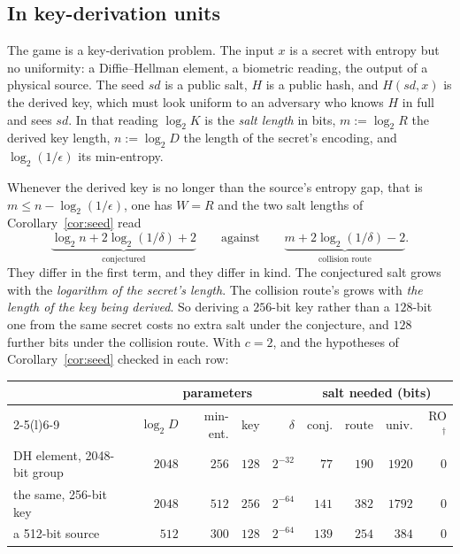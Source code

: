 \documentclass{aicr-solution}
\newcommand{\sd}{\mathit{sd}}
\begin{document}
\subsection*{In key-derivation units}

The game is a key-derivation problem. The input $x$ is a secret with entropy but no uniformity: a
Diffie--Hellman element, a biometric reading, the output of a physical source. The seed $\sd$ is a
public salt, $H$ is a public hash, and $H(\sd,x)$ is the derived key, which must look uniform to an
adversary who knows $H$ in full and sees $\sd$. In that reading $\log_2 K$ is the \emph{salt length}
in bits, $m := \log_2 R$ the derived key length, $n := \log_2 D$ the length of the secret's
encoding, and $\log_2(1/\epsilon)$ its min-entropy.

Whenever the derived key is no longer than the source's entropy gap, that is $m \le n - \log_2(1/\epsilon)$,
one has $W = R$ and the two salt lengths of Corollary~\ref{cor:seed} read
\[
  \underbrace{\log_2 n + 2\log_2(1/\delta) + 2}_{\text{conjectured}}
  \qquad\text{against}\qquad
  \underbrace{m + 2\log_2(1/\delta) - 2}_{\text{collision route}} .
\]
They differ in the first term, and they differ in kind. The conjectured salt grows with the
\emph{logarithm of the secret's length}. The collision route's grows with \emph{the length of the
key being derived}. So deriving a $256$-bit key rather than a $128$-bit one from the same secret
costs no extra salt under the conjecture, and $128$ further bits under the collision route. With
$c = 2$, and the hypotheses of Corollary~\ref{cor:seed} checked in each row:

\begin{center}\small
\begin{tabular}{@{}lrrrrrrrr@{}}
\toprule
 & \multicolumn{4}{c}{parameters} & \multicolumn{4}{c}{salt needed (bits)} \\
\cmidrule(lr){2-5}\cmidrule(l){6-9}
 & $\log_2 D$ & min-ent. & key & $\delta$ & conj. & route & univ. & RO$^{\dagger}$ \\
\midrule
DH element, 2048-bit group & $2048$ & $256$ & $128$ & $2^{-32}$ & $77$  & $190$ & $1920$ & $0$ \\
the same, 256-bit key      & $2048$ & $512$ & $256$ & $2^{-64}$ & $141$ & $382$ & $1792$ & $0$ \\
a 512-bit source           & $512$  & $300$ & $128$ & $2^{-64}$ & $139$ & $254$ & $384$  & $0$ \\
\bottomrule
\end{tabular}
\end{center}
\end{document}
